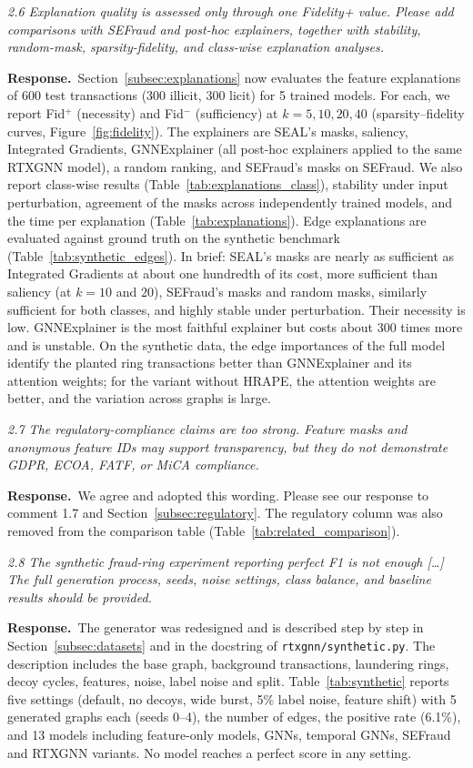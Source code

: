 \documentclass[11pt]{article}
\newenvironment{comment}{\par\medskip\noindent\begin{minipage}{\linewidth}\itshape\color{black!75}}{\end{minipage}\par\smallskip}
\newcommand{\resp}{\par\noindent\textbf{Response.}\ }
\begin{document}
\begin{comment}
2.6 Explanation quality is assessed only through one Fidelity+ value. Please add comparisons with SEFraud and post-hoc explainers, together with stability, random-mask, sparsity-fidelity, and class-wise explanation analyses.
\end{comment}
\resp Section~\ref{subsec:explanations} now evaluates the feature explanations of 600 test transactions (300 illicit, 300 licit) for 5 trained models. For each, we report Fid$^{+}$ (necessity) and Fid$^{-}$ (sufficiency) at $k=5,10,20,40$ (sparsity--fidelity curves, Figure~\ref{fig:fidelity}). The explainers are SEAL's masks, saliency, Integrated Gradients, GNNExplainer (all post-hoc explainers applied to the same RTXGNN model), a random ranking, and SEFraud's masks on SEFraud. We also report class-wise results (Table~\ref{tab:explanations_class}), stability under input perturbation, agreement of the masks across independently trained models, and the time per explanation (Table~\ref{tab:explanations}). Edge explanations are evaluated against ground truth on the synthetic benchmark (Table~\ref{tab:synthetic_edges}). In brief: SEAL's masks are nearly as sufficient as Integrated Gradients at about one hundredth of its cost, more sufficient than saliency (at $k=10$ and $20$), SEFraud's masks and random masks, similarly sufficient for both classes, and highly stable under perturbation. Their necessity is low. GNNExplainer is the most faithful explainer but costs about 300 times more and is unstable. On the synthetic data, the edge importances of the full model identify the planted ring transactions better than GNNExplainer and its attention weights; for the variant without HRAPE, the attention weights are better, and the variation across graphs is large.

\begin{comment}
2.7 The regulatory-compliance claims are too strong. Feature masks and anonymous feature IDs may support transparency, but they do not demonstrate GDPR, ECOA, FATF, or MiCA compliance.
\end{comment}
\resp We agree and adopted this wording. Please see our response to comment 1.7 and Section~\ref{subsec:regulatory}. The regulatory column was also removed from the comparison table (Table~\ref{tab:related_comparison}).

\begin{comment}
2.8 The synthetic fraud-ring experiment reporting perfect F1 is not enough [\dots] The full generation process, seeds, noise settings, class balance, and baseline results should be provided.
\end{comment}
\resp The generator was redesigned and is described step by step in Section~\ref{subsec:datasets} and in the docstring of \texttt{rtxgnn/synthetic.py}. The description includes the base graph, background transactions, laundering rings, decoy cycles, features, noise, label noise and split. Table~\ref{tab:synthetic} reports five settings (default, no decoys, wide burst, 5\% label noise, feature shift) with 5 generated graphs each (seeds 0--4), the number of edges, the positive rate (6.1\%), and 13 models including feature-only models, GNNs, temporal GNNs, SEFraud and RTXGNN variants. No model reaches a perfect score in any setting.
\end{document}
